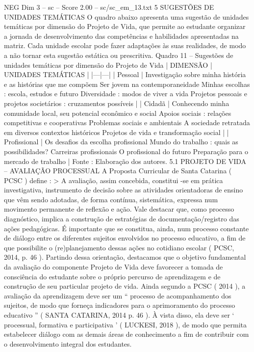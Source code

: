 \begin{textsample}{NEG Dim 3 – sc – Score 2.00 – sc/sc\_em\_13.txt}  \label{ex:f3_neg_227}
5 SUGESTÕES DE UNIDADES TEMÁTICAS O quadro abaixo apresenta uma sugestão de unidades temáticas por dimensão do Projeto de Vida, que permite ao estudante organizar a jornada de desenvolvimento das competências e habilidades apresentadas na matriz.
Cada unidade escolar pode fazer adaptações às suas realidades, de modo a não tornar esta sugestão estática ou prescritiva.
Quadro 11 – Sugestões de unidades temáticas por dimensão do Projeto de Vida | DIMENSÃO | UNIDADES TEMÁTICAS | |---|---| | Pessoal | Investigação sobre minha história e as histórias que me compõem Ser jovem na contemporaneidade Minhas escolhas : escola, estudos e futuro Diversidade : modos de viver a vida Projetos pessoais e projetos societários : cruzamentos possíveis | | Cidadã | Conhecendo minha comunidade local, seu potencial econômico e social Apoios sociais : relações competitivas e cooperativas Problemas sociais e ambientais A sociedade retratada em diversos contextos históricos Projetos de vida e transformação social | | Profissional | Os desafios da escolha profissional Mundo do trabalho : quais as possibilidades?
Carreiras profissionais O profissional do futuro Preparação para o mercado de trabalho | Fonte : Elaboração dos autores. 5.1 PROJETO DE VIDA – AVALIAÇÃO PROCESSUAL A Proposta Curricular de Santa Catarina ( PCSC ) define : > A avaliação, assim concebida, constitui -se em prática investigativa, instrumento de decisão sobre as atividades orientadoras de ensino que vêm sendo adotadas, de forma contínua, sistemática, expressa num movimento permanente de reflexão e ação.
Vale destacar que, como processo diagnóstico, implica a construção de estratégias de documentação/registro das ações pedagógicas.
É importante que se constitua, ainda, num processo constante de diálogo entre os diferentes sujeitos envolvidos no processo educativo, a fim de que possibilite o (re)planejamento dessas ações no cotidiano escolar ( PCSC, 2014, p. 46 ).
Partindo dessa orientação, destacamos que o objetivo fundamental da avaliação do componente Projeto de Vida deve favorecer a tomada de consciência do estudante sobre o próprio percurso de aprendizagem e de construção de seu particular projeto de vida.
Ainda segundo a PCSC ( 2014 ), a avaliação da aprendizagem deve ser um “ processo de acompanhamento dos sujeitos, de modo que forneça indicadores para o aprimoramento do processo educativo ” ( SANTA CATARINA, 2014 p. 46 ).
À vista disso, ela deve ser ‘ processual, formativa e participativa ’ ( LUCKESI, 2018 ), de modo que permita estabelecer diálogo com as demais áreas de conhecimento a fim de contribuir com o desenvolvimento integral dos estudantes.

\end{textsample}
